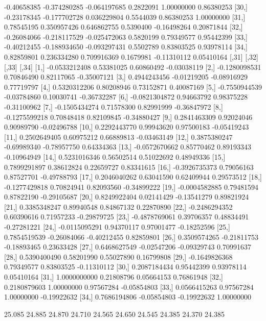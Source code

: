 \documentclass[a4paper,11pt]{scrartcl}
\begin{document}
\begin{Schunk}
\begin{Soutput}
[29,] -0.40658385 -0.374280285 -0.064197685  0.2822091  1.00000000  0.86380253
[30,] -0.23178345 -0.177702728  0.036229804  0.5544039  0.86380253  1.00000000
[31,]  0.78545195  0.350957426  0.646862755  0.5390400 -0.16498264  0.20871844
[32,] -0.26084066 -0.218117529 -0.025472063  0.5820199  0.79349577  0.95442399
[33,] -0.40212455 -0.188934650 -0.093297431  0.5502789  0.83803525  0.93978114
[34,]  0.82859801  0.236334280  0.709916369  0.1679981 -0.11310112  0.05410164
              [,31]       [,32]       [,33]       [,34]
 [1,] -0.0533212408  0.53381025  0.60860492 -0.03038119
 [2,] -0.1280098531  0.70846490  0.82117065 -0.35007121
 [3,]  0.4944243456 -0.01219205 -0.08916929  0.77719797
 [4,]  0.5320312206  0.80208946  0.73152871  0.40087169
 [5,] -0.7550944539 -0.03784860  0.10030741 -0.36732287
 [6,] -0.0821304872  0.94663792  0.98375228 -0.31100962
 [7,] -0.1505434274  0.71578300  0.82991999 -0.36847972
 [8,] -0.1275599218  0.70848418  0.82109845 -0.34880427
 [9,]  0.2841463309  0.92024046  0.90989790 -0.02496788
[10,]  0.2292443770  0.99943620  0.97500183 -0.05419243
[11,]  0.2502649405  0.60975212  0.66889813 -0.03463149
[12,]  0.3875380247 -0.69989340 -0.78957750  0.64334363
[13,] -0.0572670662  0.85770462  0.89193343 -0.10964949
[14,]  0.5231016346  0.56502514  0.51022692  0.48949336
[15,]  0.7899291897  0.38612824  0.22659727  0.83341615
[16,] -0.3926735373  0.79056163  0.87527701 -0.49788793
[17,]  0.2046040262  0.63041590  0.62409944  0.29573512
[18,] -0.1277429818  0.70824941  0.82093560 -0.34899222
[19,] -0.0004582885  0.79481594  0.87822190 -0.29105687
[20,]  0.8249922404  0.02141429 -0.13541279  0.89821924
[21,]  0.3385348247  0.89940548  0.84867132  0.22870890
[22,] -0.2486294352  0.60390616  0.71957233 -0.29879725
[23,] -0.4878769061  0.39706357  0.48834491 -0.27281221
[24,] -0.0115095291  0.94370117  0.97001477 -0.18252596
[25,]  0.7854519539 -0.26084066 -0.40212455  0.82859801
[26,]  0.3509574265 -0.21811753 -0.18893465  0.23633428
[27,]  0.6468627549 -0.02547206 -0.09329743  0.70991637
[28,]  0.5390400490  0.58201990  0.55027890  0.16799808
[29,] -0.1649826368  0.79349577  0.83803525 -0.11310112
[30,]  0.2087184434  0.95442399  0.93978114  0.05410164
[31,]  1.0000000000  0.21808796  0.05664153  0.76861948
[32,]  0.2180879603  1.00000000  0.97567284 -0.05854803
[33,]  0.0566415263  0.97567284  1.00000000 -0.19922632
[34,]  0.7686194806 -0.05854803 -0.19922632  1.00000000
\end{Soutput}
\begin{Soutput}
  [1] 25.085 24.885 24.870 24.710 24.565 24.650 24.545 24.385 24.370 24.385

\end{Soutput}
\end{Schunk}
\end{document}
